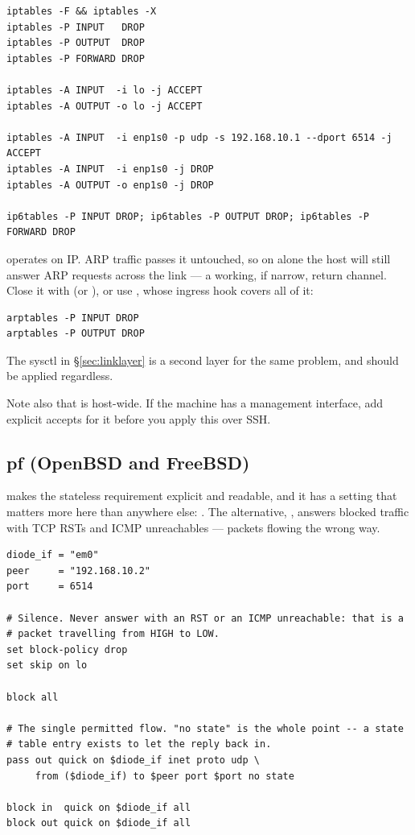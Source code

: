 \documentclass[11pt,a4paper]{article}
\begin{document}
\begin{lstlisting}[style=shell,caption={DESTINATION host}]
iptables -F && iptables -X
iptables -P INPUT   DROP
iptables -P OUTPUT  DROP
iptables -P FORWARD DROP

iptables -A INPUT  -i lo -j ACCEPT
iptables -A OUTPUT -o lo -j ACCEPT

iptables -A INPUT  -i enp1s0 -p udp -s 192.168.10.1 --dport 6514 -j ACCEPT
iptables -A INPUT  -i enp1s0 -j DROP
iptables -A OUTPUT -o enp1s0 -j DROP

ip6tables -P INPUT DROP; ip6tables -P OUTPUT DROP; ip6tables -P FORWARD DROP
\end{lstlisting}

\begin{warnbox}
 operates on IP. ARP traffic passes it untouched, so on
 alone the \dstside{} host will still answer ARP requests
across the link --- a working, if narrow, return channel. Close it with
 (or ), or use , whose
 ingress hook covers all of it:
\begin{lstlisting}[style=shell]
arptables -P INPUT DROP
arptables -P OUTPUT DROP
\end{lstlisting}
The  sysctl in \S\ref{sec:linklayer} is a second layer for
the same problem, and should be applied regardless.
\end{warnbox}

Note also that  is host-wide. If the machine has a
management interface, add explicit accepts for it before you apply this over
SSH.

\subsection{pf (OpenBSD and FreeBSD)}

 makes the stateless requirement explicit and readable, and it has a
setting that matters more here than anywhere else: .
The alternative, , answers blocked traffic with TCP RSTs and ICMP
unreachables --- packets flowing the wrong way.

\begin{lstlisting}[style=pf,caption={\file{/etc/pf.conf} --- SOURCE host}]
diode_if = "em0"
peer     = "192.168.10.2"
port     = 6514

# Silence. Never answer with an RST or an ICMP unreachable: that is a
# packet travelling from HIGH to LOW.
set block-policy drop
set skip on lo

block all

# The single permitted flow. "no state" is the whole point -- a state
# table entry exists to let the reply back in.
pass out quick on $diode_if inet proto udp \
     from ($diode_if) to $peer port $port no state

block in  quick on $diode_if all
block out quick on $diode_if all
\end{lstlisting}
\end{document}
